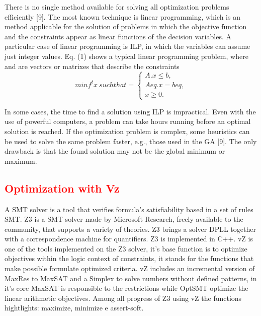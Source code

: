 There is no single method available for solving all optimization problems efficiently [9]. The most known technique is linear programming, which is an method applicable for the solution of problems in which the objective function and the constraints appear as linear functions of the decision variables. A particular case of linear programming is ILP, in which the variables can assume just integer values. Eq. (1) shows a typical linear programming problem, where  and  are vectors or matrixes that describe the constraints
\begin{equation}
  minf^t x \: such that  = 
  \begin{cases}
    A.x \leq b, \\ 
    Aeq.x = beq, \\ 
    x \geq 0.
  \end{cases}
\end{equation}

In some cases, the time to find a solution using ILP is impractical. Even with the use of powerful computers, a problem can take hours running before an optimal solution is reached. If the optimization problem is complex, some heuristics can be used to solve the same problem faster, e.g., those used in the GA [9]. The only drawback is that the found solution may not be the global minimum or maximum.

\subsection{\textcolor{Red}{Optimization with Vz}}

A SMT solver is a tool that verifies formula's satisfiability based in a set of rules SMT. Z3 is a SMT solver made by Microsoft Research, freely available to the community, that supports a variety of theories. Z3 brings a solver DPLL together with a correspondence machine for quantifiers. Z3 is implemented in C++.
vZ is one of the tools implemented on the Z3 solver, it's base function is to optimize objectives within the logic context of constraints, it stands for the functions that make possible formulate optimized criteria.
vZ includes an incremental version of MaxRes to MaxSAT and a Simplex to solve numbers without defined patterns, in it's core MaxSAT is responsible to the restrictions while OptSMT optimize the linear arithmetic objectives.
Among all progress of Z3 using vZ the functions hightlights: maximize, minimize e assert-soft.

